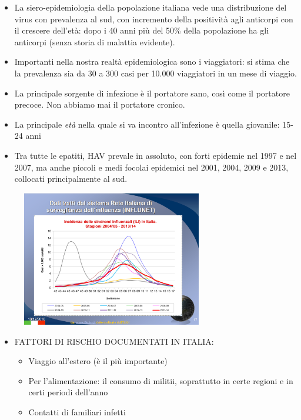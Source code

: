 \begin{itemize}
\item
  La siero-epidemiologia della popolazione italiana vede una
  distribuzione del virus con prevalenza al sud, con incremento della
  positività agli anticorpi con il crescere dell'età: dopo i 40 anni più
  del 50\% della popolazione ha gli anticorpi (senza storia di malattia
  evidente).
\item
  Importanti nella nostra realtà epidemiologica sono i viaggiatori: si
  stima che la prevalenza sia da 30 a 300 casi per 10.000 viaggiatori in
  un mese di viaggio.
\item
  La principale sorgente di infezione è il portatore sano, così come il
  portatore precoce. Non abbiamo mai il portatore cronico.
\item
  La principale \emph{età} nella quale si va incontro all'infezione è
  quella giovanile: 15-24 anni
\item
  Tra tutte le epatiti, HAV prevale in assoluto, con forti epidemie nel
  1997 e nel 2007, ma anche piccoli e medi focolai epidemici nel 2001,
  2004, 2009 e 2013, collocati principalmente al sud.
\end{itemize}

\begin{figure}[!ht]
\centering
	\includegraphics[width=0.7\textwidth]{02/image3.png}
\end{figure}


\begin{itemize}
\item
  FATTORI DI RISCHIO DOCUMENTATI IN ITALIA:

  \begin{itemize}
  \item
    Viaggio all'estero (è il più importante)
  \item
    Per l'alimentazione: il consumo di militii, soprattutto in certe
    regioni e in certi periodi dell'anno
  \item
    Contatti di familiari infetti
  \end{itemize}
\end{itemize}
